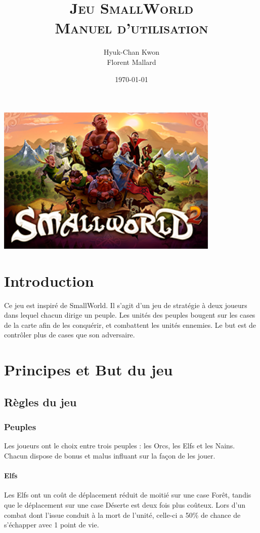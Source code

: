 \documentclass[a4paper]{article}
\title{
\textsc{Jeu SmallWorld\\
\LARGE Manuel d'utilisation}
}
\author
{
	Hyuk-Chan {\sc Kwon}\\
    Florent {\sc Mallard}\\
}
\date{\today}
\begin{document}
	\maketitle
	\begin{center}
		\includegraphics[width=0.8\textwidth]{../../IHM/StartScreen.png}~\\[5cm]
	\end{center}

\newpage
\tableofcontents
\newpage

\section*{Introduction}
Ce jeu est inspiré de SmallWorld. Il s'agit d'un jeu de stratégie à deux joueurs dans lequel chacun dirige un peuple. Les unités des peuples bougent sur les cases de la carte afin de les conquérir, et combattent les unités ennemies. Le but est de contrôler plus de cases que son adversaire.\\

\section{Principes et But du jeu}
	\subsection{Règles du jeu}
		\subsubsection{Peuples}
		Les joueurs ont le choix entre trois peuples : les Orcs, les Elfs et les Nains. Chacun dispose de bonus et malus influant sur la façon de les jouer.

\paragraph{Elfs} Les Elfs ont un coût de déplacement réduit de moitié sur une case Forêt, tandis que le déplacement sur une case Déserte est deux fois plus coûteux. Lors d'un combat dont l'issue conduit à la mort de l'unité, celle-ci a 50\% de chance de s'échapper avec 1 point de vie.
\end{document}
